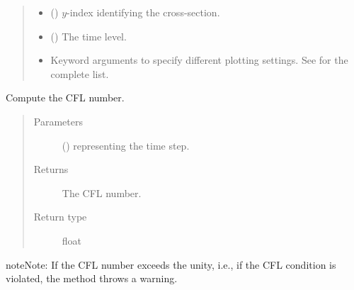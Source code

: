 \documentclass[letterpaper,10pt,english]{sphinxmanual}
\begin{document}
\begin{fulllineitems}
\begin{fulllineitems}
\begin{quote}
\begin{description}
\begin{itemize}
\begin{itemize}
\begin{description}
\end{description}

\end{itemize}


\item {} 
 () \textendash{} \(y\)-index identifying the cross-section.

\item {} 
 () \textendash{} The time level.

\item {} 
 \textendash{} Keyword arguments to specify different plotting settings.
See {\hyperref[\detokenize{api:tasmania.utils.utils_plot.contourf_xz}]{}} for the complete list.

\end{itemize}

\end{description}\end{quote}

\end{fulllineitems}


\begin{fulllineitems}
\label{\detokenize{api:storages.state_isentropic.StateIsentropic.get_cfl}}
Compute the CFL number.
\begin{quote}\begin{description}
\item[{Parameters}] \leavevmode
{} () \textendash{}  representing the time step.

\item[{Returns}] \leavevmode
The CFL number.

\item[{Return type}] \leavevmode
float

\end{description}\end{quote}

\begin{sphinxadmonition}{note}{Note:}
If the CFL number exceeds the unity, i.e., if the CFL condition is violated, the method throws a warning.
\end{sphinxadmonition}


\end{fulllineitems}
\end{fulllineitems}
\end{document}
